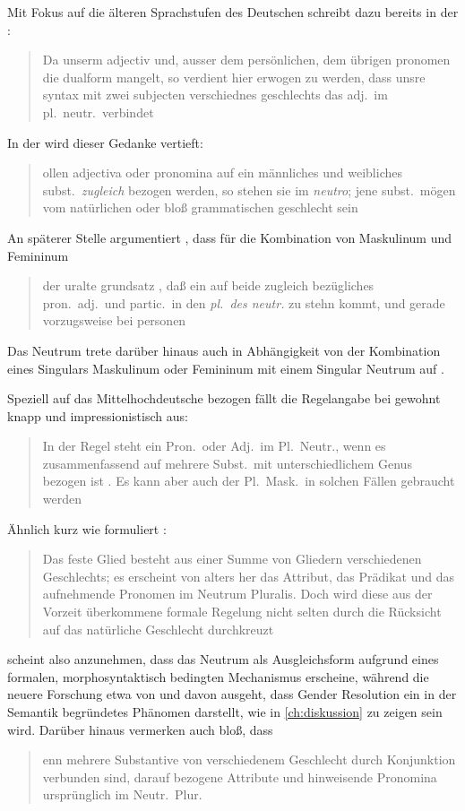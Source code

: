 Mit Fokus auf die älteren Sprachstufen des Deutschen schreibt dazu bereits
\citeauthor{grimm1848} in der :
\blockcquote[978]{grimm1848}{Da unserm adjectiv und, ausser dem
persönlichen, dem übrigen pronomen die dualform mangelt, so verdient hier
erwogen zu werden, dass unsre syntax mit zwei subjecten verschiednes
geschlechts das adj.\ im pl.~neutr.\ verbindet}. In der  wird dieser Gedanke vertieft:
\blockcquote[311--312]{grimm1890}{ollen adjectiva oder pronomina
auf ein männliches und weibliches subst.\ \emph{zugleich} bezogen werden, so
stehen sie im \emph{neutro}; jene subst.\ mögen vom natürlichen oder bloß
grammatischen geschlecht sein}. An späterer Stelle argumentiert
\citeauthor{grimm1898}, dass für die Kombination von Maskulinum und Femininum
\blockcquote[329]{grimm1898}{der uralte grundsatz , daß ein auf
beide zugleich bezügliches pron.\ adj.\ und partic.\ in den \emph{pl.\ des
neutr.} zu stehn kommt, und gerade vorzugsweise bei personen}. Das Neutrum
trete darüber hinaus auch in Abhängigkeit von der Kombination eines Singulars
Maskulinum oder Femininum mit einem Singular Neutrum auf
\autocite[331]{grimm1898}.

Speziell auf das Mittelhochdeutsche bezogen fällt die Regelangabe bei
\citeauthor{paul2007} gewohnt knapp und impressionistisch aus:
\blockcquote[384]{paul2007}{In der Regel steht ein Pron.\ oder Adj.\ im
Pl.~Neutr., wenn es zusammenfassend auf mehrere Subst.\ mit unterschiedlichem
Genus bezogen ist \textelp{}. Es kann aber auch der Pl.~Mask.\ in solchen
Fällen gebraucht werden}. Ähnlich kurz wie \citet{paul2007} formuliert
\citet[39]{behaghel1928}: \blockquote{Das feste Glied besteht aus einer Summe
von Gliedern verschiedenen Geschlechts; es erscheint von alters her das
Attribut, das Prädikat und das aufnehmende Pronomen im Neutrum Pluralis.
\textelp{} Doch wird diese aus der Vorzeit überkommene formale Regelung nicht
selten durch die Rücksicht auf das natürliche Geschlecht durchkreuzt}.

\citet{behaghel1928} scheint also anzunehmen, dass das Neutrum als
Ausgleichsform aufgrund eines formalen, morphosyntaktisch bedingten Mechanismus
erscheine, während die neuere Forschung etwa von \citet{wechslerzlatic2003} und
\citet{wechsler2009} davon ausgeht, dass Gender Resolution ein in der Semantik
begründetes Phänomen darstellt, wie in \cref{ch:diskussion} zu zeigen sein
wird. Darüber hinaus vermerken auch \citet[188]{dal2014} bloß, dass
\blockquote{enn mehrere Substantive von verschiedenem Geschlecht
durch Konjunktion verbunden sind, \textelp{} darauf bezogene Attribute und
hinweisende Pronomina ursprünglich im Neutr.\ Plur.\ }.

